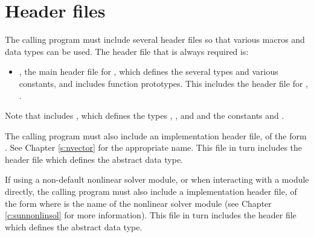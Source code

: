 \section{Header files}\label{ss:header_sim}
The calling program must include several header files so that various macros
and data types can be used. The header file that is always required is:
\begin{itemize}
\item  {},
  the main header file for {\cvode}, which defines the several
  types and various constants, and includes function prototypes.  This
  includes the header file for {\cvls}, .
\end{itemize}
Note that  includes ,
which defines the types , , and 
and the constants  and .

The calling program must also include an {\nvector} implementation header file,
of the form \\ \noindent {}.  See Chapter \ref{s:nvector}
for the appropriate name.  This file in turn includes the header file
 which defines the abstract  data type.

If using a non-default nonlinear solver module, or when interacting
with a {\sunnonlinsol} module directly, the calling program must also
include a {\sunnonlinsol} implementation header file, of the form
 where \id{***} is the name of the
nonlinear solver module (see Chapter \ref{c:sunnonlinsol} for more
information). This file in turn includes the header file
 which defines the abstract
 data type.

